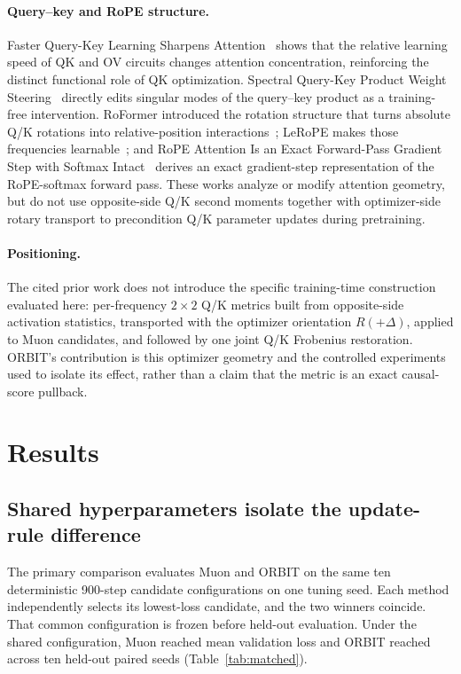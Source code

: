 \documentclass[10pt]{article}
\begin{document}
\paragraph{Query--key and RoPE structure.}
Faster Query-Key Learning Sharpens Attention~\cite{vashisht2026qk} shows that the relative
learning speed of QK and OV circuits changes attention concentration, reinforcing the
distinct functional role of QK optimization. Spectral Query-Key Product Weight Steering~\cite{tiwari2026spectral}
directly edits singular modes of the query--key product as a training-free intervention.
RoFormer introduced the rotation structure that turns absolute Q/K rotations into
relative-position interactions~\cite{su2021roformer}; LeRoPE makes those frequencies
learnable~\cite{karypis2026lerope}; and RoPE Attention Is an Exact Forward-Pass Gradient
Step with Softmax Intact~\cite{huang2026rope} derives an exact gradient-step representation
of the RoPE-softmax forward pass. These works analyze or modify attention geometry, but do
not use opposite-side Q/K second moments together with optimizer-side rotary transport to
precondition Q/K parameter updates during pretraining.

\paragraph{Positioning.}
The cited prior work does not introduce the specific training-time construction evaluated
here: per-frequency $2\times2$ Q/K metrics built from opposite-side activation statistics,
transported with the optimizer orientation $R(+\Delta)$, applied to Muon candidates, and
followed by one joint Q/K Frobenius restoration. ORBIT's contribution is this optimizer
geometry and the controlled experiments used to isolate its effect, rather than a claim
that the metric is an exact causal-score pullback.



\section{Results}
\subsection{Shared hyperparameters isolate the update-rule difference}
The primary comparison evaluates Muon and ORBIT on the same ten deterministic 900-step
candidate configurations on one tuning seed. Each method independently selects its
lowest-loss candidate, and the two winners coincide. That common configuration is frozen
before held-out evaluation. Under the shared configuration, Muon reached mean validation
loss \MatchedMuonLoss{} and ORBIT reached \MatchedOrbitLoss{} across ten held-out paired
seeds (Table~\ref{tab:matched}).
\end{document}
